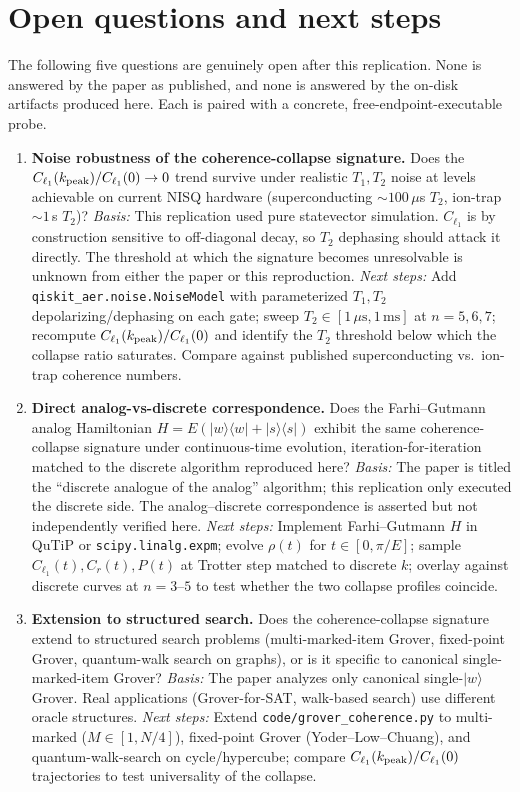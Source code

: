 \section{Open questions and next steps}

The following five questions are genuinely open after this replication.
None is answered by the paper as published, and none is answered by
the on-disk artifacts produced here. Each is paired with a concrete,
free-endpoint-executable probe.

\begin{enumerate}

\item \textbf{Noise robustness of the coherence-collapse signature.}
Does the $C_{\ell_1}(k_{\rm peak})/C_{\ell_1}(0) \to 0$ trend survive
under realistic $T_1, T_2$ noise at levels achievable on current NISQ
hardware (superconducting ${\sim}100\,\mu$s $T_2$, ion-trap ${\sim}1\,$s
$T_2$)?
\emph{Basis:} This replication used pure statevector simulation. $C_{\ell_1}$
is by construction sensitive to off-diagonal decay, so $T_2$ dephasing
should attack it directly. The threshold at which the signature becomes
unresolvable is unknown from either the paper or this reproduction.
\emph{Next steps:} Add \texttt{qiskit\_aer.noise.NoiseModel} with
parameterized $T_1, T_2$ depolarizing/dephasing on each gate; sweep
$T_2 \in [1\,\mu\text{s}, 1\,\text{ms}]$ at $n=5,6,7$; recompute
$C_{\ell_1}(k_{\rm peak})/C_{\ell_1}(0)$ and identify the $T_2$
threshold below which the collapse ratio saturates. Compare against
published superconducting vs.\ ion-trap coherence numbers.

\item \textbf{Direct analog-vs-discrete correspondence.}
Does the Farhi--Gutmann analog Hamiltonian
$H = E(|w\rangle\langle w| + |s\rangle\langle s|)$ exhibit the same
coherence-collapse signature under continuous-time evolution,
iteration-for-iteration matched to the discrete algorithm reproduced
here?
\emph{Basis:} The paper is titled the ``discrete analogue of the analog''
algorithm; this replication only executed the discrete side. The
analog--discrete correspondence is asserted but not independently
verified here.
\emph{Next steps:} Implement Farhi--Gutmann $H$ in QuTiP or
\texttt{scipy.linalg.expm}; evolve $\rho(t)$ for $t \in [0, \pi/E]$;
sample $C_{\ell_1}(t), C_r(t), P(t)$ at Trotter step matched to
discrete $k$; overlay against discrete curves at $n=3\text{--}5$ to
test whether the two collapse profiles coincide.

\item \textbf{Extension to structured search.}
Does the coherence-collapse signature extend to structured search
problems (multi-marked-item Grover, fixed-point Grover, quantum-walk
search on graphs), or is it specific to canonical single-marked-item
Grover?
\emph{Basis:} The paper analyzes only canonical single-$|w\rangle$
Grover. Real applications (Grover-for-SAT, walk-based search) use
different oracle structures.
\emph{Next steps:} Extend \texttt{code/grover\_coherence.py} to
multi-marked ($M \in [1, N/4]$), fixed-point Grover (Yoder--Low--Chuang),
and quantum-walk-search on cycle/hypercube; compare
$C_{\ell_1}(k_{\rm peak})/C_{\ell_1}(0)$ trajectories to test
universality of the collapse.


\end{enumerate}
